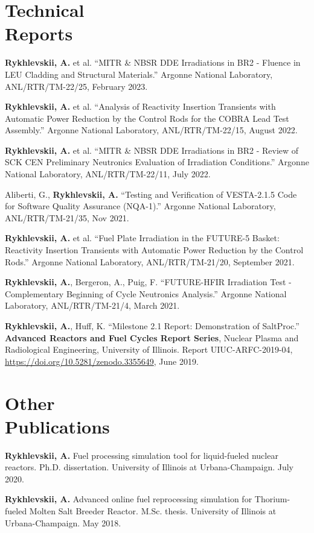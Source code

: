 \documentclass[margin,line]{resume}
\begin{document}
\begin{resume}
\section{\mysidestyle Technical\\Reports}
\begin{bibenum}
    \item \textbf{Rykhlevskii, A.} et al. ``MITR \& NBSR DDE Irradiations in BR2 - Fluence in LEU
    Cladding and Structural Materials.''
	Argonne National Laboratory, ANL/RTR/TM-22/25, February 2023.
    \item \textbf{Rykhlevskii, A.} et al. ``Analysis of Reactivity Insertion Transients with
    Automatic Power Reduction by the Control Rods for the COBRA Lead Test Assembly.''
	Argonne National Laboratory, ANL/RTR/TM-22/15, August 2022.
    \item \textbf{Rykhlevskii, A.} et al. ``MITR \& NBSR DDE Irradiations in BR2 - Review of
    SCK CEN Preliminary Neutronics Evaluation of Irradiation Conditions.''
	Argonne National Laboratory, ANL/RTR/TM-22/11, July 2022.
	\item Aliberti, G., \textbf{Rykhlevskii, A.} ``Testing and Verification of VESTA-2.1.5
	Code for Software Quality Assurance (NQA-1).''
	Argonne National Laboratory, ANL/RTR/TM-21/35, Nov 2021. 
	\item \textbf{Rykhlevskii, A.} et al. ``Fuel Plate Irradiation
	in the FUTURE-5 Basket: Reactivity Insertion Transients with
	Automatic Power Reduction by the Control Rods.''
	Argonne National Laboratory, ANL/RTR/TM-21/20, September 2021.
	\item \textbf{Rykhlevskii, A.}, Bergeron, A., Puig, F. ``FUTURE-HFIR 
	Irradiation Test - Complementary Beginning of Cycle Neutronics Analysis.''
	Argonne National Laboratory, ANL/RTR/TM-21/4, March 2021.
	\item \textbf{Rykhlevskii, A.}, Huff, K. ``Milestone 2.1 Report: 
	Demonstration of 
	SaltProc.'' \textbf{Advanced Reactors and Fuel Cycles Report Series}, 
	Nuclear Plasma and Radiological Engineering, University of Illinois.  
	Report UIUC-ARFC-2019-04, \url{https://doi.org/10.5281/zenodo.3355649}, 
	June 2019.
\end{bibenum}
\section{\mysidestyle Other\\Publications}
\begin{bibenum}
	\item \textbf{Rykhlevskii, A.} Fuel processing simulation tool for
	liquid-fueled nuclear reactors.
	Ph.D. dissertation. University of Illinois at Urbana-Champaign.  July 2020.
	\item \textbf{Rykhlevskii, A.} Advanced  online fuel reprocessing 
	simulation for Thorium-fueled Molten Salt Breeder Reactor.
	M.Sc. thesis. University of Illinois at Urbana-Champaign.  May 2018.
\end{bibenum}

\end{resume}
\end{document}

